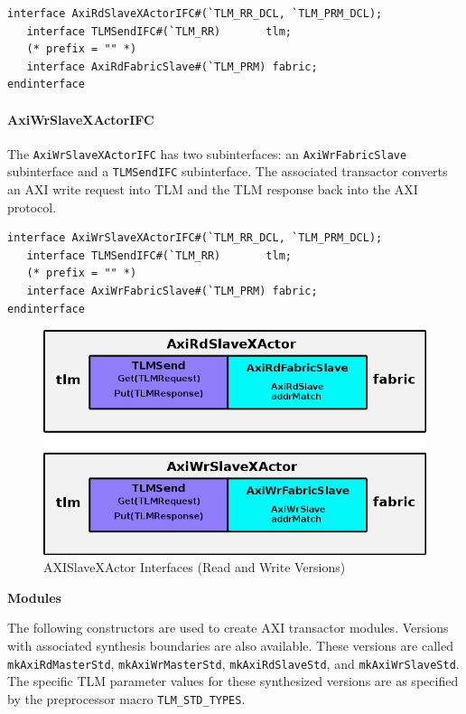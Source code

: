 \documentclass[twoside,letterpaper]{article}
\newcommand{\te}[1]{\texttt{#1}}
\begin{document}

\begin{verbatim}
interface AxiRdSlaveXActorIFC#(`TLM_RR_DCL, `TLM_PRM_DCL);
   interface TLMSendIFC#(`TLM_RR)       tlm;
   (* prefix = "" *)
   interface AxiRdFabricSlave#(`TLM_PRM) fabric;
endinterface
\end{verbatim}

\paragraph{\bf AxiWrSlaveXActorIFC} The \te{AxiWrSlaveXActorIFC} has two subinterfaces:
an \te{AxiWrFabricSlave} subinterface and a \te{TLMSendIFC}
subinterface. The associated transactor converts an AXI write request
into TLM and the TLM response back into the AXI protocol.


\begin{verbatim}
interface AxiWrSlaveXActorIFC#(`TLM_RR_DCL, `TLM_PRM_DCL);
   interface TLMSendIFC#(`TLM_RR)       tlm;
   (* prefix = "" *)
   interface AxiWrFabricSlave#(`TLM_PRM) fabric;
endinterface
\end{verbatim}

\begin{figure}[ht]
\begin{center}
\includegraphics[height = 2 in]{AXISlaveXActor}
\caption{AXISlaveXActor Interfaces (Read and Write Versions)}
\label{AxiSlaveXActor}
\end{center}
\end{figure}

{\bf Modules}

The following constructors are used to create AXI transactor modules.  Versions
with associated synthesis boundaries are also available. These
versions are called \te{mkAxiRdMasterStd}, \te{mkAxiWrMasterStd}, \te{mkAxiRdSlaveStd}, 
and \te{mkAxiWrSlaveStd}. The specific TLM parameter values for these 
synthesized versions are as specified by the preprocessor macro \te{TLM\_STD\_TYPES}.
\end{document}
